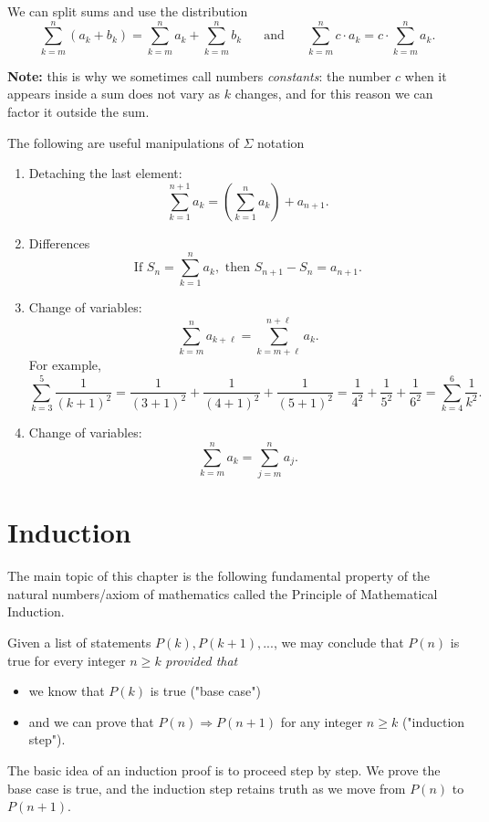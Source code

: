 \documentclass[11pt,dvipsnames]{book}
\numberwithin{figure}{section} %
\numberwithin{table}{section} %
\begin{document}
We can split sums and use the distribution \[\sum_{k=m}^{n} (a_{k} +b_{k})=\sum_{k=m}^{n} a_{k} +\sum_{k=m}^{n} b_{k}\;\; \;\;\; \mbox{ and }\;\;\;\;\; \sum_{k=m}^{n} c\cdot a_{k} =c\cdot \sum_{k=m}^{n} a_{k} .
\]

{\bf Note:} this is why we sometimes call numbers {\it constants}: the number $c$ when it appears inside a sum does not vary as $k$ changes, and for this reason we can factor it outside the sum.

The following are useful manipulations of $\Sigma$ notation
\begin{enumerate}
\item Detaching the last element:
\[ \sum_{k=1}^{n+1} a_k = \left(\sum_{k=1}^{n} a_k\right) + a_{n+1}.\]
\item Differences
\[ \mbox{If } S_n=\sum_{k=1}^{n} a_k, \mbox{ then } S_{n+1}-S_n = a_{n+1}.\]
\item Change of variables:
\[
\sum_{k=m}^{n} a_{k+\ell} =\sum_{k=m+\ell}^{n+\ell} a_{k}.
\]
For example,
\[
\sum_{k=3}^{5} \frac{1}{(k+1)^2}
=\frac{1}{(3+1)^2}+\frac{1}{(4+1)^2}+\frac{1}{(5+1)^2}
=\frac{1}{4^2}+\frac{1}{5^2}+\frac{1}{6^2} = \sum_{k=4}^{6} \frac{1}{k^2}.
\]
\item Change of variables:
\[
\sum_{k=m}^{n} a_{k} =\sum_{j=m}^{n} a_{j}.
\]
\end{enumerate}

\section{Induction}

The main topic of this chapter is the following fundamental property of the natural numbers/axiom of mathematics called the Principle of Mathematical Induction.

\begin{definition}
Given a list of statements $P(k),P(k+1),...$, we may conclude that $P(n)$ is true for every integer $n\geqslant k$ {\em provided that}

\begin{itemize}
\item we know that $P(k)$ is true ("base case")
\item and we can prove that $P(n)\Rightarrow P(n+1)$ for any integer $n\geqslant k$ ("induction step").
\end{itemize}
\end{definition}

The basic idea of an induction proof is to proceed step by step.
We prove the base case is true, and the induction step retains truth as we move from $P(n)$ to $P(n+1)$.
\end{document}
